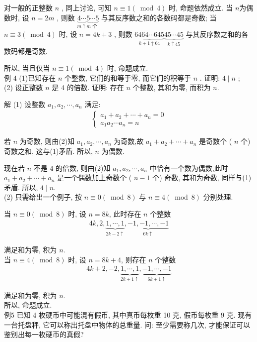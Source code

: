	对一般的正整数 $n$ , 同上讨论, 可知 $n \equiv 1(\bmod 4)$ 时, 命题依然成立. 当 $n$为偶数时, 设 $n=2 m$ , 则数 $\underbrace{4 \cdots}_{m \uparrow} \underbrace{5 \cdots 5}_{m \text { 个 }}$ 与其反序数之和的各数码都是奇数; 当 $n \equiv 3(\bmod 4)$ 时, 设 $n=4 k+3$ , 则数 $\underbrace{6464 \cdots 645}_{k+1 \uparrow 64} \underbrace{45 \cdots 45}_{k \uparrow 45}$ 与其反序数之和的各数码都是奇数.

	所以, 当且仅当 $n \equiv 1(\bmod 4)$ 时, 命题成立. \\
	例 4 (1)已知存在 $n$ 个整数, 它们的和等于零, 而它们的积等于 $n$ . 证明:  $4 \mid n$ ; \\
	(2) 设正整数 $n$ 是 4 的倍数. 证明: 存在 $n$ 个整数, 其和为零, 而积为 $n$.

	解 (1) 设整数 $a_{1}, a_{2}, \cdots, a_{n}$ 满足:
	\begin{align*}
		\left\{\begin{array}{l}
			       a_{1}+a_{2}+\cdots+a_{n}=0 \\
			       a_{1} a_{2} \cdots a_{n}=n
		       \end{array}\right.
	\end{align*}

	若 $n$ 为奇数, 则由(2)知 $a_{1}, a_{2}, \cdots, a_{n}$ 为奇数,故 $a_{1}+a_{2}+\cdots+a_{n}$ 是奇数个 ( $n$ 个) 奇数之和, 这与(1)矛盾. 所以, $n$ 为偶数.

	现在若 $n$ 不是 4 的倍数, 则由(2)知 $a_{1}, a_{2}, \cdots, a_{n}$ 中恰有一个数为偶数,此时 $a_{1}+a_{2}+\cdots+a_{n}$ 是一个偶数加上奇数个 ( $n-1$ 个) 奇数, 其和为奇数, 同样与(1)矛盾. 所以, $4 \mid n$.\\
	(2) 只需给出一个例子, 按 $n \equiv 0(\bmod 8)$ 与 $n \equiv 4(\bmod 8)$ 分别处理.

	当 $n \equiv 0(\bmod 8)$ 时, 设 $n=8 k$, 此时存在 $n$ 个整数
	\begin{align*}
		4 k, 2, \underbrace{1, \cdots, 1}_{2 k-2 \uparrow}, \underbrace{-1,-1, \cdots,-1}_{6 k \uparrow}
	\end{align*}

	满足和为零, 积为 $n$.\\
	当 $n \equiv 4(\bmod 8)$ 时, 设 $n=8 k+4$, 则存在 $n$ 个整数
	\begin{align*}
		4 k+2,-2, \underbrace{1, \cdots, 1}_{2 k+1 \uparrow}, \underbrace{-1, \cdots,-1}_{6 k+1 \uparrow}
	\end{align*}

	满足和为零, 积为 $n$.\\
	所以, 命题成立.\\
	例5 已知 4 枚硬币中可能混有假币, 其中真币每枚重 10 克, 假币每枚重 9 克. 现有一台托盘秤, 它可以称出托盘中物体的总重量. 问: 至少需要称几次, 才能保证可以鉴别出每一枚硬币的真假?

